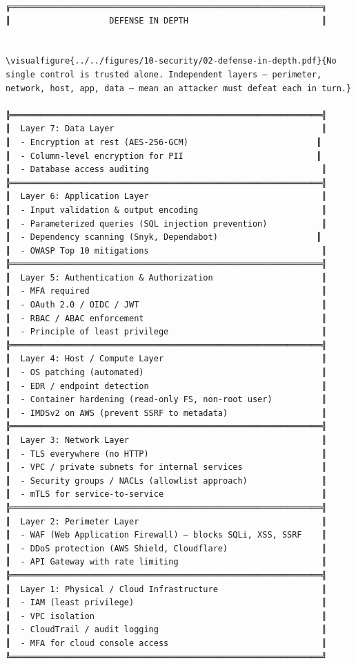 \documentclass[11pt]{article}
\begin{document}
\begin{verbatim}
╔═══════════════════════════════════════════════════════════════╗
║                    DEFENSE IN DEPTH                           ║


\visualfigure{../../figures/10-security/02-defense-in-depth.pdf}{No single control is trusted alone. Independent layers — perimeter, network, host, app, data — mean an attacker must defeat each in turn.}

╠═══════════════════════════════════════════════════════════════╣
║  Layer 7: Data Layer                                          ║
║  - Encryption at rest (AES-256-GCM)                          ║
║  - Column-level encryption for PII                           ║
║  - Database access auditing                                   ║
╠═══════════════════════════════════════════════════════════════╣
║  Layer 6: Application Layer                                   ║
║  - Input validation & output encoding                         ║
║  - Parameterized queries (SQL injection prevention)           ║
║  - Dependency scanning (Snyk, Dependabot)                    ║
║  - OWASP Top 10 mitigations                                   ║
╠═══════════════════════════════════════════════════════════════╣
║  Layer 5: Authentication & Authorization                      ║
║  - MFA required                                               ║
║  - OAuth 2.0 / OIDC / JWT                                     ║
║  - RBAC / ABAC enforcement                                    ║
║  - Principle of least privilege                               ║
╠═══════════════════════════════════════════════════════════════╣
║  Layer 4: Host / Compute Layer                                ║
║  - OS patching (automated)                                    ║
║  - EDR / endpoint detection                                   ║
║  - Container hardening (read-only FS, non-root user)          ║
║  - IMDSv2 on AWS (prevent SSRF to metadata)                   ║
╠═══════════════════════════════════════════════════════════════╣
║  Layer 3: Network Layer                                       ║
║  - TLS everywhere (no HTTP)                                   ║
║  - VPC / private subnets for internal services                ║
║  - Security groups / NACLs (allowlist approach)               ║
║  - mTLS for service-to-service                                ║
╠═══════════════════════════════════════════════════════════════╣
║  Layer 2: Perimeter Layer                                     ║
║  - WAF (Web Application Firewall) — blocks SQLi, XSS, SSRF    ║
║  - DDoS protection (AWS Shield, Cloudflare)                   ║
║  - API Gateway with rate limiting                             ║
╠═══════════════════════════════════════════════════════════════╣
║  Layer 1: Physical / Cloud Infrastructure                     ║
║  - IAM (least privilege)                                      ║
║  - VPC isolation                                              ║
║  - CloudTrail / audit logging                                 ║
║  - MFA for cloud console access                               ║
╚═══════════════════════════════════════════════════════════════╝


\end{verbatim}
\end{document}
